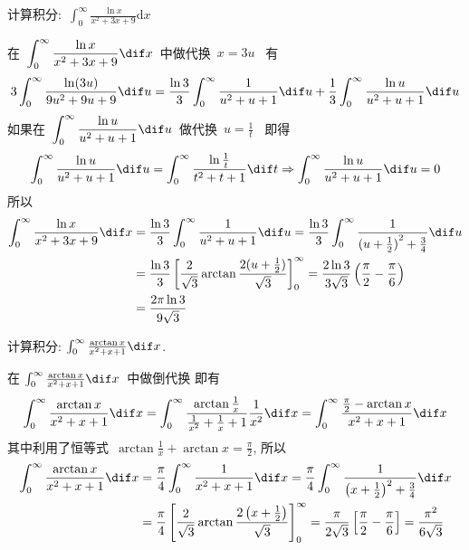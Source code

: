 \documentclass[color=green,titlestyle=hang]{elegantbook}%
\begin{document}
\begin{exercise}
计算积分:~$\int_0^\infty  \frac{{\ln x}}{{{x^2} + 3x + 9}}\textrm{d}x$
\end{exercise}\begin{solution}
在~$\displaystyle\int_0^\infty  {\frac{{\ln x}}{{{x^2} + 3x + 9}}\dif x} $~中做代换~$x=3u$~
有\[3\int_0^\infty  {\frac{{\ln (3u)}}{{9{u^2} + 9u + 9}}\dif u}= \frac{{\ln 3}}{3}\int_0^\infty  {\frac{1}{{{u^2} + u + 1}}\dif u}  + \frac{1}{3}\int_0^\infty  {\frac{{\ln u}}{{{u^2} + u + 1}}\dif u} \]
如果在~$\displaystyle\int_0^\infty  {\frac{{\ln u}}{{{u^2} + u + 1}}\dif u} $~做代换~$\displaystyle u = \frac{1}{t}$~
即得~\[\int_0^\infty  {\frac{{\ln u}}{{{u^2} + u + 1}}\dif u}  =
\int_0^\infty  {\frac{{\ln \frac{1}{t}}}{{{t^2} + t + 1}}\dif t}  \Rightarrow \int_0^\infty  {\frac{{\ln u}}{{{u^2} + u + 1}}\dif u}  = 0\]
所以\begin{align*}
\int_0^\infty  {\frac{{\ln x}}{{{x^2} + 3x + 9}}\dif x}  &= \frac{{\ln 3}}{3}\int_0^\infty  {\frac{1}{{{u^2} + u + 1}}\dif u}  = \frac{{\ln 3}}{3}\int_0^\infty  {\frac{1}{{{{(u + \frac{1}{2})}^2} + \frac{3}{4}}}\dif u} \\
&= \frac{{\ln 3}}{3}\left[ {\frac{2}{{\sqrt 3 }}\arctan \frac{{2(u + \frac{1}{2})}}{{\sqrt 3 }}} \right]_0^\infty  = \frac{{2\ln 3}}{{3\sqrt 3 }}\left( {\frac{\pi }{2} - \frac{\pi }{6}} \right)\\
& = \frac{{2\pi \ln 3}}{{9\sqrt 3 }}
\end{align*}
\end{solution}

\begin{exercise}
计算积分: $\int_0^\infty\frac{\arctan x}{x^{2}+x+1}\dif x$.
\end{exercise}\begin{solution}
在 $\int_0^\infty\frac{\arctan x}{x^{2}+x+1}\dif x$~中做倒代换
即有
\[
\int_{0}^{\infty} \frac{\arctan x}{x^{2}+x+1}\dif x=\int_{0}^{\infty} \frac{\arctan \frac{1}{x}}{\frac{1}{x^{2}}+\frac{1}{x}+1} \frac{1}{x^{2}}\dif x=\int_{0}^{\infty} \frac{\frac{\pi}{2}-\arctan x}{x^{2}+x+1}\dif x
\]
其中利用了恒等式~$\arctan\frac{1}{x}+\arctan x=\frac{\pi}{2}$, 所以
\begin{align*}
\int_{0}^{\infty} \frac{\arctan x}{x^{2}+x+1}\dif x 
&=\frac{\pi}{4} \int_{0}^{\infty} \frac{1}{x^{2}+x+1}\dif x=\frac{\pi}{4} \int_{0}^{\infty} \frac{1}{\left(x+\frac{1}{2}\right)^{2}+\frac{3}{4}}\dif x \\ &=\frac{\pi}{4}\left[\frac{2}{\sqrt{3}} \arctan \frac{2\left(x+\frac{1}{2}\right)}{\sqrt{3}}\right]_{0}^{\infty}=\frac{\pi}{2 \sqrt{3}}\left[\frac{\pi}{2}-\frac{\pi}{6}\right]=\frac{\pi^{2}}{6 \sqrt{3}}
\end{align*}
\end{solution}
\end{document}
